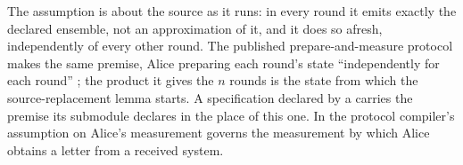 
The assumption is about the source as it runs: in every round it emits
exactly the declared ensemble, not an approximation of it, and it does so
afresh, independently of every other round. The published prepare-and-measure
protocol makes the same premise, Alice preparing each round's state
``independently for each round'' \cite[Protocol~2, step~1(a)]{tupkary2026decoy};
the product it gives the $n$ rounds is the state from which the
source-replacement lemma starts. A specification declared by a  carries the premise its submodule declares in the place of this one. In
 the protocol compiler's assumption on Alice's
measurement governs the measurement by which Alice obtains a letter from a
received system.

